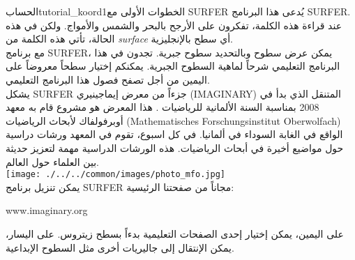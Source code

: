 \begin{surferIntroPage}{الحساب}{tutorial_koord1}{الخطوات الأولى مع SURFER}
يُدعى هذا البرنامج \textenglish{SURFER}. عند قراءة هذه الكلمة، تفكرون على الأرجح بالبحر والشمس والأمواج. ولكن في هذه الحالة، تأتي هذه الكلمة من \textenglish{\it surface} أي سطح بالإنجليزية.
\\
مع برنامج \textenglish{SURFER}، يمكن عرض سطوح وبالتحديد سطوح جبرية. تجدون في هذا البرنامج التعليمي شرحاً لماهية السطوح الجبرية. يمكنكم إختيار سطحاً معروضاً على اليمين من أجل تصفح فصول هذا البرنامج التعليمي.\\
يشكل \textenglish{SURFER} جزءاً من معرض إيماجينيري
 \textenglish{(IMAGINARY)}
  المتنقل الذي بدأ في 2008 بمناسبة السنة الألمانية للرياضيات . هذا المعرض هو مشروع قام به معهد أوبرفولفاك لأبحاث الرياضيات
\textenglish{(Mathematisches Forschungsinstitut Oberwolfach)}
 الواقع في الغابة السوداء في ألمانيا. في كل اسبوع، تقوم في المعهد ورشات دراسية حول مواضيع أخيرة في أبحاث الرياضيات. هذه الورشات الدراسية مهمة لتعزيز حديثة بين العلماء حول العالم. \\
\vspace{0.2cm} \hspace{3.5cm}\texttt{[image: ./../../common/images/photo\_mfo.jpg]}\\
يمكن تنزيل برنامج \textenglish{SURFER} مجاناً من صفحتنا الرئيسية: \\
\begin{centering}
\textenglish{www.imaginary.org}\\
\end{centering}
 \vspace{0.2cm}
على اليمين، يمكن إختيار إحدى الصفحات التعليمية بدءاً بسطح زيتروس.
  على اليسار، يمكن الإنتقال إلى جاليريات أخرى مثل السطوح الإبداعية.
\end{surferIntroPage}

